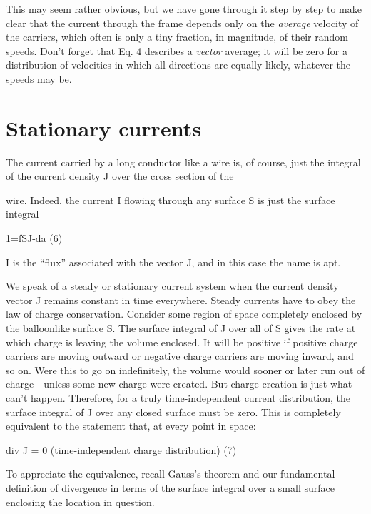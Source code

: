 This may seem rather obvious, but we have gone through it step
by step to make clear that the current through the frame depends
only on the \emph{average} velocity of the carriers, which often is only a tiny
fraction, in magnitude, of their random speeds. Don't forget that
Eq. 4 describes a \emph{vector} average; it will be zero for a distribution of
velocities in which all directions are equally likely, whatever the
speeds may be.

\iffalse

\section{Stationary currents}
The current carried by a long conductor like a wire is, of course,
just the integral of the current density J over the cross section of the

wire. Indeed, the current I flowing through any surface S is just the
surface integral

1=fSJ-da (6)
\begin{equation}
\end{equation}

I is the ``flux'' associated with the vector J, and in this case the name
is apt.

We speak of a steady or stationary current system when the current
density vector J remains constant in time everywhere. Steady
currents have to obey the law of charge conservation. Consider
some region of space completely enclosed by the balloonlike surface
S. The surface integral of J over all of S gives the rate at which
charge is leaving the volume enclosed. It will be positive if positive
charge carriers are moving outward or negative charge carriers are
moving inward, and so on. Were this to go on indefinitely, the volume
would sooner or later run out of charge---unless some new
charge were created. But charge creation is just what can't happen.
Therefore, for a truly time-independent current distribution, the
surface integral of J over any closed surface must be zero. This is
completely equivalent to the statement that, at every point in space:

div J = 0 (time-independent charge distribution) (7)
\begin{equation}
\end{equation}

To appreciate the equivalence, recall Gauss's theorem and our fundamental
definition of divergence in terms of the surface integral
over a small surface enclosing the location in question.

